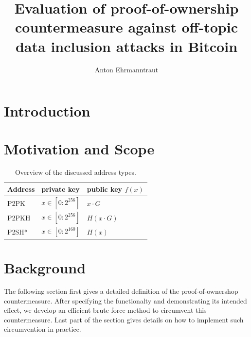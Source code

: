 \documentclass[10pt,a4paper,twocolumn]{article}
\title{Evaluation of proof-of-ownership countermeasure against off-topic data inclusion attacks in Bitcoin}
\author{Anton Ehrmanntraut}
\renewenvironment{abstract}
{\begin{quote}
\noindent {\bfseries \abstractname.}}
{\end{quote}
}
\begin{document}
\raggedbottom
\maketitle
\begin{abstract}
\end{abstract}

\section{Introduction}

\section{Motivation and Scope}

\begin{table}
    \centering
    \begin{tabular}{lll}
        \toprule
        \textbf{Address} & \textbf{private key} & \textbf{public key} $f(x)$ \\
        \midrule
        P2PK & $x\in [0{:}2^{256}]$ & $x\cdot G$ \\
        P2PKH & $x\in [0{:}2^{256}]$ & $H(x\cdot G)$ \\
        P2SH* & $x\in [0{:}2^{160}]$ & $H(x)$ \\
        \bottomrule
    \end{tabular}
    \caption{Overview of the discussed address types.}
\end{table}



\section{Background}

The following section first gives a detailed definition of the proof-of-ownershop countermeasure. After specifying the functionalty and demonstrating its intended effect, we develop an efficient brute-force method to circumvent this countermeasure. Last part of the section gives details on how to implement such circumvention in practice.
\end{document}
